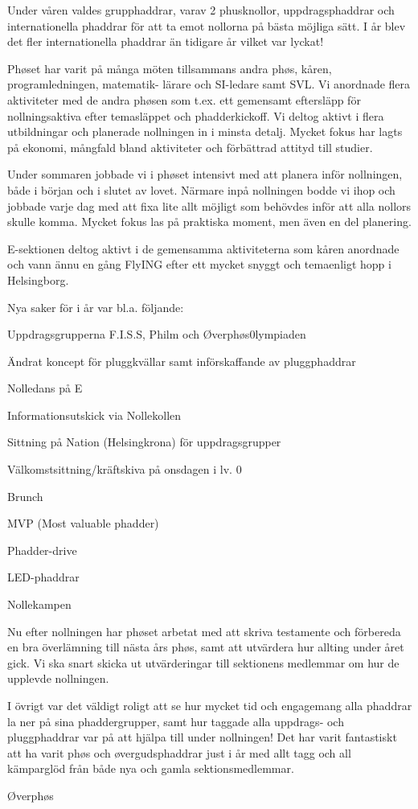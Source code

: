 \documentclass[../_main/handlingar.tex]{subfiles}
\begin{document}

Under våren valdes grupphaddrar, varav 2 phusknollor, uppdragsphaddrar och internationella phaddrar för att ta emot nollorna på bästa möjliga sätt. I år blev det fler internationella phaddrar än tidigare år vilket var lyckat!

Phøset har varit på många möten tillsammans andra phøs, kåren, programledningen, matematik- lärare och SI-ledare samt SVL. Vi anordnade flera aktiviteter med de andra phøsen som t.ex. ett gemensamt eftersläpp för nollningsaktiva efter temasläppet och phadderkickoff. Vi deltog aktivt i flera utbildningar och planerade nollningen in i minsta detalj. Mycket fokus har lagts på ekonomi, mångfald bland aktiviteter och förbättrad attityd till studier.

Under sommaren jobbade vi i phøset intensivt med att planera inför nollningen, både i början och i slutet av lovet. Närmare inpå nollningen bodde vi ihop och jobbade varje dag med att fixa lite allt möjligt som behövdes inför att alla nollors skulle komma. Mycket fokus las på praktiska moment, men även en del planering.

E-sektionen deltog aktivt i de gemensamma aktiviteterna som kåren anordnade och vann ännu en gång FlyING efter ett mycket snyggt och temaenligt hopp i Helsingborg.

Nya saker för i år var bl.a. följande:
\begin{dashlist}
    \item Uppdragsgrupperna F.I.S.S, Philm och Øverphøs0lympiaden
    \item Ändrat koncept för pluggkvällar samt införskaffande av pluggphaddrar
    \item Nolledans på E
    \item Informationsutskick via Nollekollen
    \item Sittning på Nation (Helsingkrona) för uppdragsgrupper
    \item Välkomstsittning/kräftskiva på onsdagen i lv. 0
    \item Brunch
    \item MVP (Most valuable phadder)
    \item Phadder-drive
    \item LED-phaddrar
    \item Nollekampen
\end{dashlist}

Nu efter nollningen har phøset arbetat med att skriva testamente och förbereda en bra överlämning till nästa års phøs, samt att utvärdera hur allting under året gick. Vi ska snart skicka ut utvärderingar till sektionens medlemmar om hur de upplevde nollningen.

I övrigt var det väldigt roligt att se hur mycket tid och engagemang alla phaddrar la ner på sina phaddergrupper, samt hur taggade alla uppdrags- och pluggphaddrar var på att hjälpa till under nollningen! Det har varit fantastiskt att ha varit phøs och øvergudsphaddrar just i år med allt tagg och all kämparglöd från både nya och gamla sektionsmedlemmar.

\begin{signatures}{1}
    \mvh
    \signature{Molly Liljebjörn Rusk}{Øverphøs}
\end{signatures}
\end{document}

